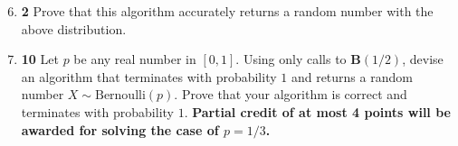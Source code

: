\documentclass[12pt]{article}
\theoremstyle{plain}
\theoremstyle{definition}
\theoremstyle{remark}
\newcommand{\pts}[1]{\lbrack\textbf{#1}\rbrack}
\begin{document}
\begin{enumerate}
\setcounter{enumi}{5}

\item \pts{2} Prove that this algorithm accurately returns a random number with the above distribution.

\begin{comment}\begin{tcolorbox}
We have four equally-likely outcomes on the value of $(u,v)$. If $(u,v)=(0,0)$, then $u+v=0$, which occurs with probability $1/4$. If $(u,v)=(0,1)$ or $(u,v)=(1,0)$, then $u+v=1$, which occurs with probability $1/4+1/4=1/2$. If $(u,v)=(1,1)$, then $u+v=2$, which occurs with probability $1/4$. This is the above distribution.
\end{tcolorbox}\end{comment}

\item \pts{10} Let $p$ be any real number in $[0,1]$. Using only calls to $\textbf{B}(1/2)$, devise an algorithm that terminates with probability $1$ and returns a random number $X\sim\text{Bernoulli}(p)$. Prove that your algorithm is correct and terminates with probability $1$. \textbf{Partial credit of at most 4 points will be awarded for solving the case of $p=1/3$.}

\begin{comment}\begin{tcolorbox}
For $p=1/3$, we can use the following algorithm:

\begin{algorithm}[H]
\DontPrintSemicolon
\KwData{none}
\KwResult{a random number $X\sim\text{Bernoulli}(1/3)$}
\While{$0=0$}{
$u\gets\textbf{B}(1/2)$\;
$v\gets\textbf{B}(1/2)$\;
\If{$u+v=0$}{
\Return{$1$}\;
}
\ElseIf{$u+v=1$}{
\Return{$0$}\;
}
}
\end{algorithm}

By Problem 6, we know the distribution of the random variable $u+v$. The probability that this algorithm doesn't return on a given step is $1/4$, so the probability that it doesn't terminate after $n$ steps is $(1/4)^n\to0$ as $n\to\infty$. If it does terminate, then on the last step there is a $1:2$ probability of returning $1$ versus returning $0$, which is the desired distribution.
\end{tcolorbox}\end{comment}

\begin{comment}\begin{tcolorbox}
For general $p$, let $p=0.b_1b_2b_3\dots$ be a binary representation of $p$. Our algorithm is:


\end{comment}
\end{enumerate}
\end{document}
